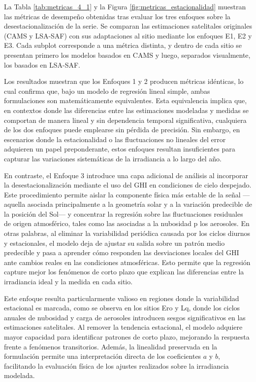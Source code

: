 \documentclass[letterpaper,12pt, twoside]{report}
\providecommand{\DIFdeltex}[1]{{\protect\color{red} \scriptsize #1}} %
\providecommand{\DIFdel}[1]{\texorpdfstring{\DIFdeltex{#1}}{}} %
\begin{document}
\DIFdel{La Tabla \ref{tab:metricas_4_1} y la Figura \ref{fig:metricas_estacionalidad} muestran las métricas de desempeño obtenidas tras evaluar los tres enfoques sobre la desestacionalización de la serie. Se comparan las estimaciones satelitales originales (CAMS y LSA-SAF) con sus adaptaciones al sitio mediante los enfoques E1, E2 y E3. Cada subplot corresponde a una métrica distinta, y dentro de cada sitio se presentan primero los modelos basados en CAMS y luego, separados visualmente, los basados en LSA-SAF.
}%

\DIFdel{Los resultados muestran que los Enfoques 1 y 2 producen métricas idénticas, lo cual confirma que, bajo un modelo de regresión lineal simple, ambas formulaciones son matemáticamente equivalentes. Esta equivalencia implica que, en contextos donde las diferencias entre las estimaciones modeladas y medidas se comportan de manera lineal y sin dependencia temporal significativa, cualquiera de los dos enfoques puede emplearse sin pérdida de precisión. Sin embargo, en escenarios donde la estacionalidad o las fluctuaciones no lineales del error adquieren un papel preponderante, estos enfoques resultan insuficientes para capturar las variaciones sistemáticas de la irradiancia a lo largo del año.
}%

\DIFdel{En contraste, el Enfoque 3 introduce una capa adicional de análisis al incorporar la desestacionalización mediante el uso del GHI en condiciones de cielo despejado. Este procedimiento permite aislar la componente física más estable de la señal —aquella asociada principalmente a la geometría solar y a la variación predecible de la posición del Sol— y concentrar la regresión sobre las fluctuaciones residuales de origen atmosférico, tales como las asociadas a la nubosidad p los aerosoles. En otras palabras, al eliminar la variabilidad periódica causada por los ciclos diurnos y estacionales, el modelo deja de ajustar su salida sobre un patrón medio predecible y pasa a aprender cómo responden las desviaciones locales del GHI ante cambios reales en las condiciones atmosféricas. Esto permite que la regresión capture mejor los fenómenos de corto plazo que explican las diferencias entre la irradiancia ideal y la medida en cada sitio.
}%

\DIFdel{Este enfoque resulta particularmente valioso en regiones donde la variabilidad estacional es marcada, como se observa en los sitios Ero y Lq, donde los ciclos anuales de nubosidad y carga de aerosoles introducen sesgos significativos en las estimaciones satelitales. Al remover la tendencia estacional, el modelo adquiere mayor capacidad para identificar patrones de corto plazo, mejorando la respuesta frente a fenómenos transitorios. Además, la linealidad preservada en la formulación permite una interpretación directa de los coeficientes $a$ y $b$, facilitando la evaluación física de los ajustes realizados sobre la irradiancia modelada.
}%
\end{document}
